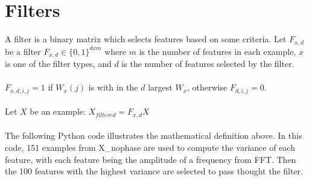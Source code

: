 \documentclass[12pt, letterpaper]{article}
\begin{document}
\section{Filters}

A filter is a binary matrix which selects features based on some criteria. 
Let $F_{x,d}$ be a filter $F_{x,d} \in \{0,1\}^{d x m}$ where $m$ is the number of features in each example, $x$ is one of the filter types, and $d$ is the number of features selected by the filter.
\\\\
$F_{x, d,i,j} = 1$ if $W_{x}(j)$ is with in the $d$ largest $W_{x}$, otherwise $F_{d,i,j} = 0$. 
\\\\
Let $X$ be an example: $X_{filtered} =  F_{x,d}X$
\\\\
The following Python code illustrates the mathematical definition above. In this code, 151 examples from X\_nophase are used to compute the variance of each feature, with each feature being the amplitude of a frequency from FFT. Then the 100 features with the highest 
variance are selected to pass thought the filter. 
    
\end{document}

